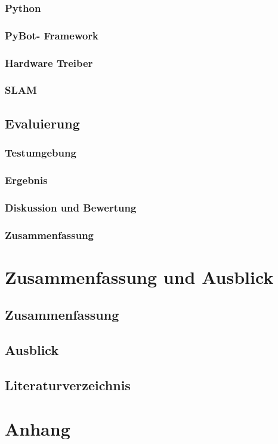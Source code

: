 \documentclass[a4paper,cleardoubleempty,BCOR1cm]{book}
\begin{document}
\subsection{Python}

\subsection{PyBot- Framework}

\subsection{Hardware Treiber}

\subsection{SLAM}



\section{Evaluierung}

\subsection{Testumgebung}

\subsection{Ergebnis}

\subsection{Diskussion und Bewertung}


\subsection{Zusammenfassung}




\chapter{Zusammenfassung und Ausblick}

\section{Zusammenfassung}

\section{Ausblick}




\section{Literaturverzeichnis}

%

\appendix
\chapter{Anhang}



\end{document}
